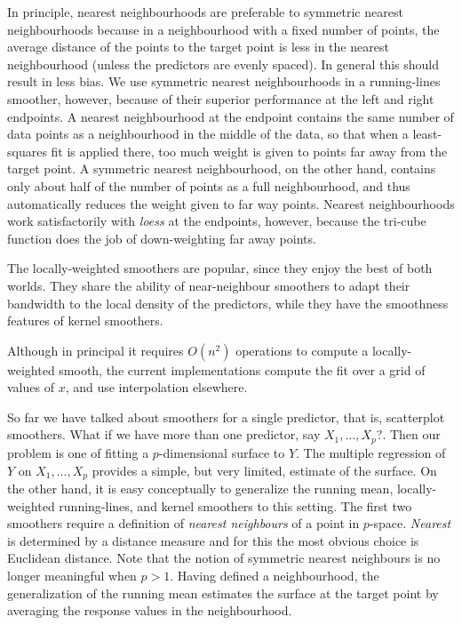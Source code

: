 In principle, nearest neighbourhoods 
are preferable to 
symmetric nearest neighbourhoods because in a  neighbourhood with 
a fixed number of points, the average distance of the points to the target point
is less in the nearest neighbourhood (unless the predictors are evenly spaced).
In general this  should result in less bias.
We use symmetric nearest neighbourhoods in a running-lines smoother, however,
because of their superior performance at the left and right endpoints.
A nearest neighbourhood at the endpoint contains the same number of data
points
as a neighbourhood in the middle of the data,
 so that when a least-squares fit is applied there, too much
weight is given to points far away from the target point.
A symmetric nearest neighbourhood, on the other hand, contains only about
half of the number of points as a full neighbourhood, and thus  
automatically reduces the weight given to far way points.
Nearest neighbourhoods work satisfactorily with {\sl loess} at the endpoints, however,
because the tri-cube function does the job of down-weighting far away points.

The locally-weighted smoothers are popular, since they enjoy the best of both worlds. 
They share the ability of near-neighbour smoothers to adapt their bandwidth 
to the local density of the predictors, while they have the smoothness features
of kernel smoothers.

Although in principal it requires $O(n^2)$ operations to compute a locally-weighted smooth, the current implementations compute the fit over a grid of values of $x$, and use interpolation elsewhere.

\Sectionskip

So far we have talked about smoothers for a single predictor, that is,
scatterplot smoothers.
What if we have more than one predictor, say $X_1,\ldots, X_p?$.
Then our problem is one of fitting a $p$-dimensional surface to $Y$.
The multiple regression of $Y$ on $X_1,\ldots, X_p$ provides a
simple, but very limited, estimate of the surface.
On the other hand,
it is easy conceptually  to generalize the running mean,  locally-weighted 
running-lines, and kernel smoothers to this setting.
The first two smoothers require a definition of {\sl nearest neighbours}
of a point in $p$-space.
{\sl Nearest} is determined by a distance measure and for this 
the most obvious choice is Euclidean distance.
Note that the notion of symmetric nearest neighbours is no longer meaningful
when $p > 1$.
Having defined a neighbourhood,
the generalization of the running mean estimates
 the surface at the target point by averaging the
response values in the neighbourhood.

